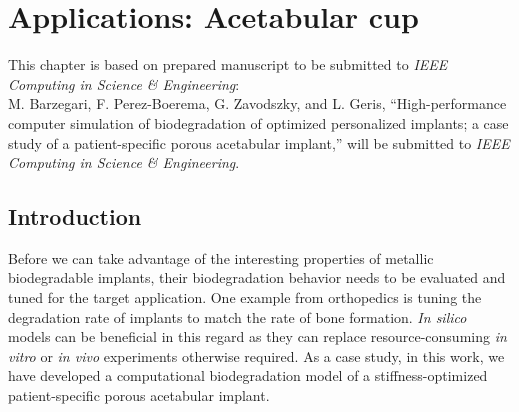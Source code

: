 \chapter{Applications: Acetabular cup}\label{ch:cup}

\begin{shaded}
This chapter is based on prepared manuscript to be submitted to  \textit{IEEE Computing in Science \& Engineering}:\\
M. Barzegari, F. Perez-Boerema, G. Zavodszky, and L. Geris, ``High-performance computer simulation of biodegradation of optimized personalized implants; a case study of a patient-specific porous acetabular implant,'' will be submitted to \textit{IEEE Computing in Science \& Engineering}.
\end{shaded}

\section{Introduction}




Before we can take advantage of the interesting properties of metallic biodegradable implants, their biodegradation behavior needs to be evaluated and tuned for the target application. One example from orthopedics is tuning the degradation rate of implants to match the rate of bone formation. \textit{In silico} models can be beneficial in this regard as they can replace resource-consuming \textit{in vitro} or \textit{in vivo }experiments otherwise required. As a case study, in this work, we have developed a computational biodegradation model of a stiffness-optimized patient-specific porous acetabular implant.


